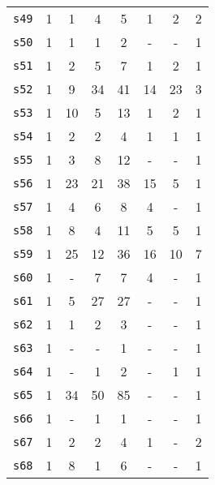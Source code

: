 \begin{longtable}{ l c c c c c c c }
\texttt{s49} & 1 & 1 & 4 & 5 & 1 & 2 & 2 \\
\texttt{s50} & 1 & 1 & 1 & 2 & - & - & 1 \\
\texttt{s51} & 1 & 2 & 5 & 7 & 1 & 2 & 1 \\
\texttt{s52} & 1 & 9 & 34 & 41 & 14 & 23 & 3 \\
\texttt{s53} & 1 & 10 & 5 & 13 & 1 & 2 & 1 \\
\texttt{s54} & 1 & 2 & 2 & 4 & 1 & 1 & 1 \\
\texttt{s55} & 1 & 3 & 8 & 12 & - & - & 1 \\
\texttt{s56} & 1 & 23 & 21 & 38 & 15 & 5 & 1 \\
\texttt{s57} & 1 & 4 & 6 & 8 & 4 & - & 1 \\
\texttt{s58} & 1 & 8 & 4 & 11 & 5 & 5 & 1 \\
\texttt{s59} & 1 & 25 & 12 & 36 & 16 & 10 & 7 \\
\texttt{s60} & 1 & - & 7 & 7 & 4 & - & 1 \\
\texttt{s61} & 1 & 5 & 27 & 27 & - & - & 1 \\
\texttt{s62} & 1 & 1 & 2 & 3 & - & - & 1 \\
\texttt{s63} & 1 & - & - & 1 & - & - & 1 \\
\texttt{s64} & 1 & - & 1 & 2 & - & 1 & 1 \\
\texttt{s65} & 1 & 34 & 50 & 85 & - & - & 1 \\
\texttt{s66} & 1 & - & 1 & 1 & - & - & 1 \\
\texttt{s67} & 1 & 2 & 2 & 4 & 1 & - & 2 \\
\texttt{s68} & 1 & 8 & 1 & 6 & - & - & 1 \\
\end{longtable}

